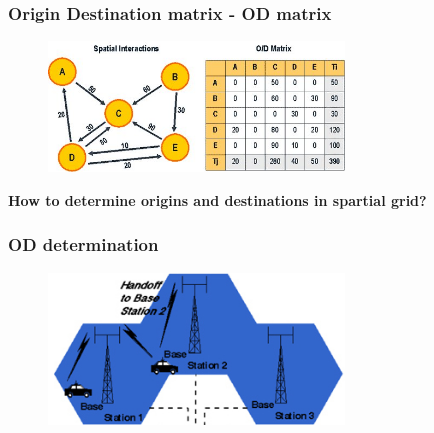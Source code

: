 \documentclass[11pt]{beamer}
\begin{document}
\begin{frame}
   \frametitle{Origin Destination matrix - OD matrix}
   \begin{figure}
      \centering
    \includegraphics[width=0.7\textwidth]{Odgraph}
    
    \end{figure}
\textbf{How to determine origins and destinations in spartial grid?}
\end{frame}

\begin{frame}
   \frametitle{OD determination}
   \begin{figure}
      \centering
    \includegraphics[width=0.7\textwidth]{cells}
    
    \end{figure}

\end{frame}
\end{document}
